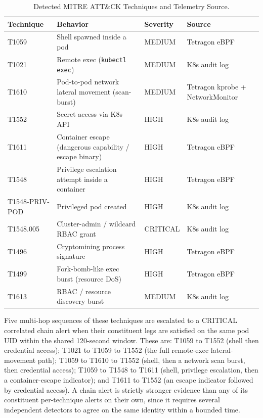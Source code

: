 \documentclass{ieeeaccess}
\begin{document}
\begin{table}[!t]
\centering
\caption{Detected MITRE ATT\&CK Techniques and Telemetry Source.}
\label{tab:techniques}
\tablebodyfont
\setlength{\tabcolsep}{2.5pt}
\begin{tabular}{@{}>{\raggedright\arraybackslash}p{}>{\raggedright\arraybackslash}p{}>{\raggedright\arraybackslash}p{}>{\raggedright\arraybackslash}p{}@{}}
\toprule
\textbf{Technique} & \textbf{Behavior} & \textbf{Severity} & \textbf{Source} \\
\midrule
T1059 & Shell spawned inside a pod & MEDIUM & Tetragon eBPF \\
T1021 & Remote exec (\texttt{kubectl exec}) & MEDIUM & K8s audit log \\
T1610 & Pod-to-pod network lateral movement (scan-burst) & MEDIUM & Tetragon kprobe + NetworkMonitor \\
T1552 & Secret access via K8s API & HIGH & K8s audit log \\
T1611 & Container escape (dangerous capability / escape binary) & HIGH & Tetragon eBPF \\
T1548 & Privilege escalation attempt inside a container & HIGH & Tetragon eBPF \\
T1548-PRIV-POD & Privileged pod created & HIGH & K8s audit log \\
T1548.005 & Cluster-admin / wildcard RBAC grant & CRITICAL & K8s audit log \\
T1496 & Cryptomining process signature & HIGH & Tetragon eBPF \\
T1499 & Fork-bomb-like exec burst (resource DoS) & HIGH & Tetragon eBPF \\
T1613 & RBAC / resource discovery burst & MEDIUM & K8s audit log \\
\bottomrule
\end{tabular}
\end{table}

Five multi-hop sequences of these techniques are escalated to a CRITICAL
correlated chain alert when their constituent legs are satisfied on the
same pod UID within the shared 120-second window. These are: T1059 to
T1552 (shell then credential access); T1021 to T1059 to T1552 (the full
remote-exec lateral-movement path); T1059 to T1610 to T1552 (shell, then
a network scan burst, then credential access); T1059 to T1548 to T1611
(shell, privilege escalation, then a container-escape indicator); and
T1611 to T1552 (an escape indicator followed by credential access). A
chain alert is strictly stronger evidence than any of its constituent
per-technique alerts on their own, since it requires several independent
detectors to agree on the same identity within a bounded time.
\end{document}
